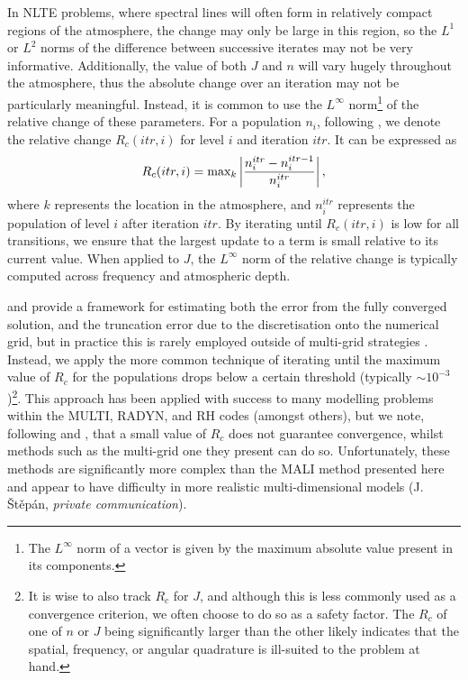 In NLTE problems, where spectral lines will often form in relatively compact regions of the atmosphere, the change may only be large in this region, so the $L^1$ or $L^2$ norms of the difference between successive iterates may not be very informative.
Additionally, the value of both $J$ and $n$ will vary hugely throughout the atmosphere, thus the absolute change over an iteration may not be particularly meaningful.
Instead, it is common to use the $L^\infty$ norm\footnote{The $L^\infty$ norm of a vector is given by the maximum absolute value present in its components.} of the relative change of these parameters.
For a population $n_i$, following \citet{Auer1994a}, we denote the relative change $R_c(itr, i)$ for level $i$ and iteration $itr$.
It can be expressed as
\begin{equation}
    R_c(itr, i) = \textnormal{max}_k \left|\frac{n_i^{itr} - n_i^{itr-1}}{n_i^{itr}}\right|,
\end{equation}
where $k$ represents the location in the atmosphere, and $n_i^{itr}$ represents the population of level $i$ after iteration $itr$.
By iterating until $R_c(itr, i)$ is low for all transitions, we ensure that the largest update to a term is small relative to its current value.
When applied to $J$, the $L^\infty$ norm of the relative change is typically computed across frequency and atmospheric depth.

\citet{Auer1994a} and \citet{FabianiBendicho1997} provide a framework for estimating both the error from the fully converged solution, and the truncation error due to the discretisation onto the numerical grid, but in practice this is rarely employed outside of multi-grid strategies \citep[e.g.][]{FabianiBendicho1997,Leger2007}.
Instead, we apply the more common technique of iterating until the maximum value of $R_c$ for the populations drops below a certain threshold (typically $\sim 10^{-3}$)\footnote{It is wise to also track $R_c$ for $J$, and although this is less commonly used as a convergence criterion, we often choose to do so as a safety factor. The $R_c$ of one of $n$ or $J$ being significantly larger than the other likely indicates that the spatial, frequency, or angular quadrature is ill-suited to the problem at hand.}.
This approach has been applied with success to many modelling problems within the MULTI, RADYN, and RH \citep{Uitenbroek2001} codes (amongst others), but we note, following \citet{Auer1994a} and \citet{FabianiBendicho1997}, that a small value of $R_c$ does not guarantee convergence, whilst methods such as the multi-grid one they present can do so.
Unfortunately, these methods are significantly more complex than the MALI method presented here and appear to have difficulty in more realistic multi-dimensional models (J. Štěpán, \emph{private communication}).


